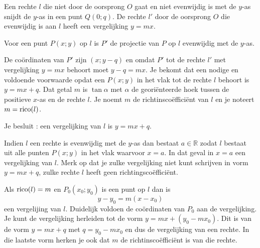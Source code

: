 Een rechte $l$ die niet door de oorsprong $O$ gaat en niet evenwijdig is met de $y$-as snijdt de $y$-as in een punt $Q(0;q)$.
De rechte $l'$ door de oorsprong $O$ die evenwijdig is aan $l$ heeft een vergelijking $y=mx$.

\begin{center}
	
\end{center}

Voor een punt $P(x;y)$ op $l$ is $P'$ de projectie van $P$ op $l$ evenwijdig met de $y$-as.


De co\"ordinaten van $P'$ zijn $(x;y-q)$ en omdat $P'$ tot de rechte $l'$ met vergelijking $y=mx$ behoort moet $y-q=mx$.
Je bekomt dat een nodige en voldoende voorwaarde opdat een $P(x;y)$ in het vlak tot de rechte $l$ behoort is $y=mx+q$.
Dat getal $m$ is $\tan \alpha$ met $\alpha$ de geori\"enteerde hoek tussen de positieve $x$-as en de rechte $l$.
Je noemt $m$ de richtinsco\"effici\"ent van $l$ en je noteert $m=\operatorname{rico} (l)$.

Je besluit : een vergelijking van $l$ is $y=mx+q$.

Indien $l$ een rechte is evenwijdig met de $y$-as dan bestaat $a \in \mathbb{R}$ zodat $l$ bestaat uit alle punten $P(x;y)$ in het vlak waarvoor $x=a$.
In dat geval in $x=a$ een vergelijking van $l$.
Merk op dat je zulke vergelijking niet kunt schrijven in vorm $y=mx+q$, zulke rechte $l$ heeft geen richtingsco\"effici\"ent.

\begin{opmerking}
	Als $\operatorname{rico}(l)=m$ en $P_0(x_0;y_0)$ is een punt op $l$ dan is
\[
y-y_0=m(x-x_0)
\]
een vergelijing van $l$.
Duidelijk voldoen de co\"ordinaten van $P_0$ aan de vergelijking.
Je kunt de vergelijking herleiden tot de vorm $y=mx+(y_0-mx_0)$.
Dit is van de vorm $y=mx+q$ met $q=y_0-mx_0$ en dus de vergelijking van een rechte.
In die laatste vorm herken je ook dat $m$ de richtinsco\"effici\"ent is van die rechte.\\
\end{opmerking}

